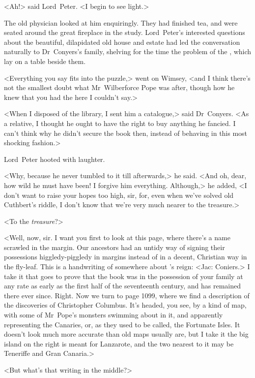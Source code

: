 <Ah!> said Lord~Peter. <I begin to see light.>

The old physician looked at him enquiringly. They had finished tea, and were seated around the great fireplace in the study. Lord~Peter's interested questions about the beautiful, dilapidated old house and estate had led the conversation naturally to Dr~Conyers's family, shelving for the time the problem of the , which lay on a table beside them.

<Everything you say fits into the puzzle,> went on Wimsey, <and I think there's not the smallest doubt what Mr~Wilberforce Pope was after, though how he knew that you had the  here I couldn't say.>

<When I disposed of the library, I sent him a catalogue,> said Dr~Conyers. <As a relative, I thought he ought to have the right to buy anything he fancied. I can't think why he didn't secure the book then, instead of behaving in this most shocking fashion.>

Lord~Peter hooted with laughter.

<Why, because he never tumbled to it till afterwards,> he said. <And oh, dear, how wild he must have been! I forgive him everything. Although,> he added, <I don't want to raise your hopes too high, sir, for, even when we've solved old Cuthbert's riddle, I don't know that we're very much nearer to the treasure.>

<To the \textit{treasure}?>

<Well, now, sir. I want you first to look at this page, where there's a name scrawled in the margin. Our ancestors had an untidy way of signing their possessions higgledy-piggledy in margins instead of in a decent, Christian way in the fly-leaf. This is a handwriting of somewhere about 's reign: <Jac: Coniers.> I take it that goes to prove that the book was in the possession of your family at any rate as early as the first half of the seventeenth century, and has remained there ever since. Right. Now we turn to page 1099, where we find a description of the discoveries of Christopher Columbus. It's headed, you see, by a kind of map, with some of Mr~Pope's monsters swimming about in it, and apparently representing the Canaries, or, as they used to be called, the Fortunate Isles. It doesn't look much more accurate than old maps usually are, but I take it the big island on the right is meant for Lanzarote, and the two nearest to it may be Teneriffe and Gran Canaria.>

<But what's that writing in the middle?>

